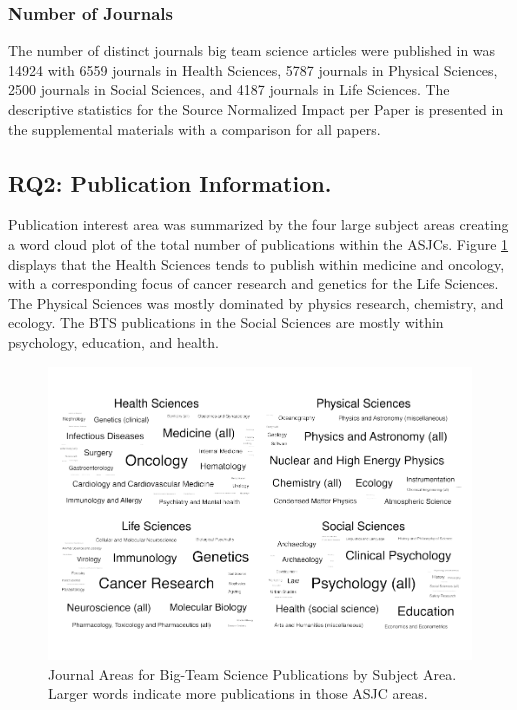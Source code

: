 \documentclass[
  man,mask,floatsintext]{apa7}
\begin{document}
\hypertarget{number-of-journals}{%
\subsubsection{Number of Journals}\label{number-of-journals}}

The number of distinct journals big team science
articles were published in was 14924 with 6559
journals in Health Sciences, 5787 journals in Physical
Sciences, 2500 journals in Social Sciences, and
4187 journals in Life Sciences. The descriptive statistics
for the Source Normalized Impact per Paper is presented in the
supplemental materials with a comparison for all papers.

\hypertarget{rq2-publication-information.}{%
\subsection{RQ2: Publication Information.}\label{rq2-publication-information.}}

Publication interest area was summarized by the four large subject areas
creating a word cloud plot of the total number of publications within
the ASJCs. Figure \ref{fig:fig-clouds} displays that the Health
Sciences tends to publish within medicine and oncology, with a
corresponding focus of cancer research and genetics for the Life
Sciences. The Physical Sciences was mostly dominated by physics
research, chemistry, and ecology. The BTS publications in the Social
Sciences are mostly within psychology, education, and health.

\begin{figure}
\centering
\includegraphics{manuscript_scopus_files/figure-latex/fig-clouds-1.pdf}
\caption{\label{fig:fig-clouds}Journal Areas for Big-Team Science Publications by Subject Area. Larger words indicate more publications in those ASJC areas.}
\end{figure}
\end{document}
